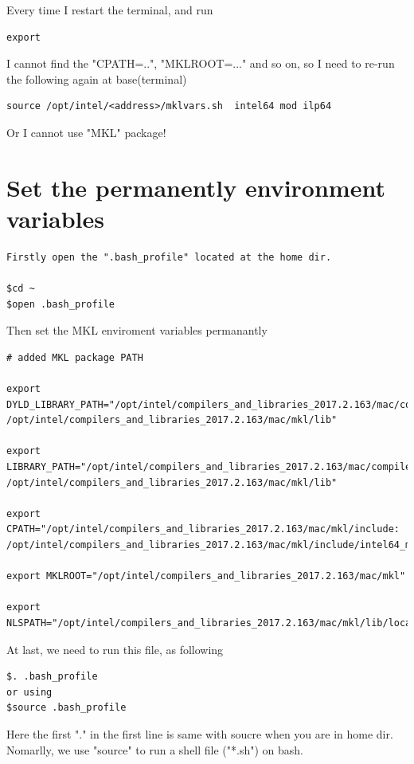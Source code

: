 Every time I restart the terminal,  and run 
\begin{verbatim}
export
\end{verbatim}
I cannot find the "CPATH=..", "MKLROOT=..." and so on, so I need to re-run the following again at base(terminal)
\begin{verbatim}
source /opt/intel/<address>/mklvars.sh  intel64 mod ilp64
\end{verbatim}
Or I cannot use "MKL" package!

\section{Set the permanently environment variables}

\begin{verbatim}
Firstly open the ".bash_profile" located at the home dir. 

$cd ~
$open .bash_profile
\end{verbatim}

Then set the MKL enviroment variables permanantly

\begin{verbatim}
# added MKL package PATH

export DYLD_LIBRARY_PATH="/opt/intel/compilers_and_libraries_2017.2.163/mac/compiler/lib:
/opt/intel/compilers_and_libraries_2017.2.163/mac/mkl/lib"

export LIBRARY_PATH="/opt/intel/compilers_and_libraries_2017.2.163/mac/compiler/lib:
/opt/intel/compilers_and_libraries_2017.2.163/mac/mkl/lib"

export CPATH="/opt/intel/compilers_and_libraries_2017.2.163/mac/mkl/include:
/opt/intel/compilers_and_libraries_2017.2.163/mac/mkl/include/intel64_mac/ilp64"

export MKLROOT="/opt/intel/compilers_and_libraries_2017.2.163/mac/mkl"

export NLSPATH="/opt/intel/compilers_and_libraries_2017.2.163/mac/mkl/lib/locale/%l_%t/%N"

\end{verbatim}

At last, we need to run this file, as  following 

\begin{verbatim}
$. .bash_profile
or using
$source .bash_profile
\end{verbatim}

Here the first "." in the first line is same with soucre when you are in home dir.  Nomarlly, we use "source" to run a shell file ("*.sh") on bash.

